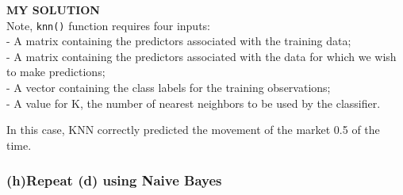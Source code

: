 \documentclass[
]{article}
\newenvironment{Shaded}{\begin{snugshade}}{\end{snugshade}}
\newcommand{\AttributeTok}[1]{\textcolor[rgb]{0.77,0.63,0.00}{#1}}
\newcommand{\CommentTok}[1]{\textcolor[rgb]{0.56,0.35,0.01}{\textit{#1}}}
\newcommand{\DecValTok}[1]{\textcolor[rgb]{0.00,0.00,0.81}{#1}}
\newcommand{\ErrorTok}[1]{\textcolor[rgb]{0.64,0.00,0.00}{\textbf{#1}}}
\newcommand{\FloatTok}[1]{\textcolor[rgb]{0.00,0.00,0.81}{#1}}
\newcommand{\FunctionTok}[1]{\textcolor[rgb]{0.00,0.00,0.00}{#1}}
\newcommand{\NormalTok}[1]{#1}
\newcommand{\OtherTok}[1]{\textcolor[rgb]{0.56,0.35,0.01}{#1}}
\newcommand{\SpecialCharTok}[1]{\textcolor[rgb]{0.00,0.00,0.00}{#1}}
\begin{document}
\textbf{MY SOLUTION}\\
Note, \texttt{knn()} function requires four inputs:\\
- A matrix containing the predictors associated with the training
data;\\
- A matrix containing the predictors associated with the data for which
we wish to make predictions;\\
- A vector containing the class labels for the training observations;\\
- A value for K, the number of nearest neighbors to be used by the
classifier.

\begin{Shaded}
\end{Shaded}

In this case, KNN correctly predicted the movement of the market 0.5 of
the time.

\hypertarget{hrepeat-d-using-naive-bayes}{%
\subsubsection{\texorpdfstring{\textbf{(h)Repeat (d) using Naive
Bayes}}{(h)Repeat (d) using Naive Bayes}}\label{hrepeat-d-using-naive-bayes}}
\end{document}
